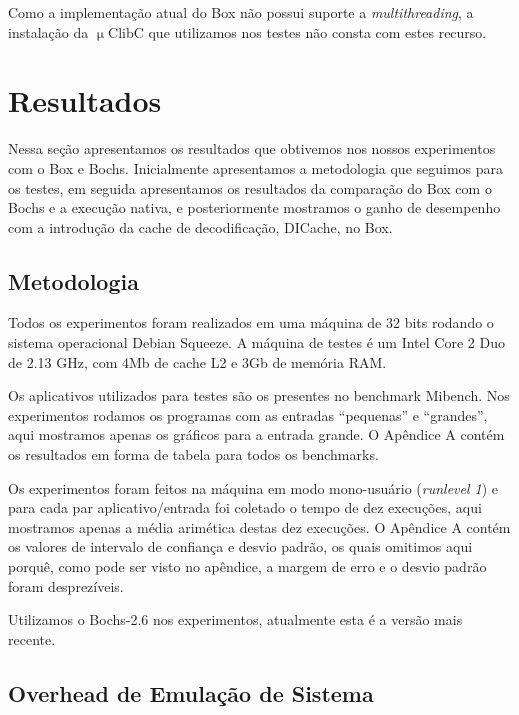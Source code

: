 \documentclass[11pt,twoside]{article}
\begin{document}
Como a implementação atual do Box não possui suporte a \emph{multithreading}, a
instalação da $\upmu$ClibC que utilizamos nos testes não consta com estes
recurso.


\section{Resultados} \label{sec:resultados}

Nessa seção apresentamos os resultados que obtivemos nos nossos experimentos
com o Box e Bochs. Inicialmente apresentamos a metodologia que seguimos para
os testes, em seguida apresentamos os resultados da comparação do Box com o
Bochs e a execução nativa, e posteriormente mostramos o ganho de desempenho com
a introdução da cache de decodificação, DICache, no Box. 

\subsection{Metodologia}

Todos os experimentos foram realizados em uma máquina de 32 bits rodando o
sistema operacional Debian Squeeze. A máquina de testes é um Intel Core 2 Duo
de 2.13 GHz, com 4Mb de cache L2 e 3Gb de memória RAM.

Os aplicativos utilizados para testes são os presentes no benchmark Mibench. Nos
experimentos rodamos os programas com as entradas ``pequenas'' e ``grandes'',
aqui mostramos apenas os gráficos para a entrada grande. O Apêndice A contém
os resultados em forma de tabela para todos os benchmarks.

Os experimentos foram feitos na máquina em modo mono-usuário (\textit{runlevel
  1}) e para cada par aplicativo/entrada foi coletado o tempo de dez execuções,
aqui mostramos apenas a média arimética destas dez execuções. O Apêndice A
contém os valores de intervalo de confiança e desvio padrão, os quais omitimos
aqui porquê, como pode ser visto no apêndice, a margem de erro e o desvio padrão
foram desprezíveis.

Utilizamos o Bochs-2.6 nos experimentos, atualmente esta é a versão mais recente.


\subsection{Overhead de Emulação de Sistema}
\end{document}
